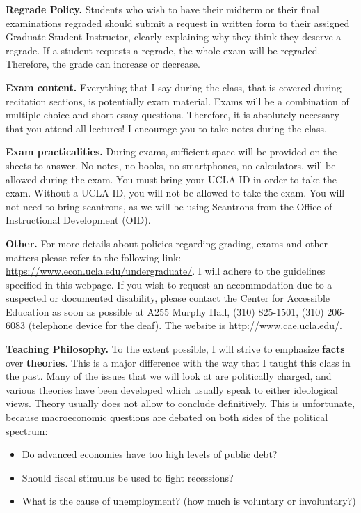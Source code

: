 \documentclass[]{book}
\providecommand{\tightlist}{%
  \setlength{\itemsep}{0pt}\setlength{\parskip}{0pt}}
\theoremstyle{definition}
\theoremstyle{definition}
\theoremstyle{definition}
\theoremstyle{remark}
\begin{document}
\textbf{Regrade Policy.} Students who wish to have their midterm or
their final examinations regraded should submit a request in written
form to their assigned Graduate Student Instructor, clearly explaining
why they think they deserve a regrade. If a student requests a regrade,
the whole exam will be regraded. Therefore, the grade can increase or
decrease.

\textbf{Exam content.} Everything that I say during the class, that is
covered during recitation sections, is potentially exam material. Exams
will be a combination of multiple choice and short essay questions.
Therefore, it is absolutely necessary that you attend all lectures! I
encourage you to take notes during the class.

\textbf{Exam practicalities.} During exams, sufficient space will be
provided on the sheets to answer. No notes, no books, no smartphones, no
calculators, will be allowed during the exam. You must bring your UCLA
ID in order to take the exam. Without a UCLA ID, you will not be allowed
to take the exam. You will not need to bring scantrons, as we will be
using Scantrons from the Office of Instructional Development (OID).

\textbf{Other.} For more details about policies regarding grading, exams
and other matters please refer to the following link:
\url{https://www.econ.ucla.edu/undergraduate/}. I will adhere to the
guidelines specified in this webpage. If you wish to request an
accommodation due to a suspected or documented disability, please
contact the Center for Accessible Education as soon as possible at A255
Murphy Hall, (310) 825-1501, (310) 206-6083 (telephone device for the
deaf). The website is \url{http://www.cae.ucla.edu/}.

\textbf{Teaching Philosophy.} To the extent possible, I will strive to
emphasize \textbf{facts} over \textbf{theories}. This is a major
difference with the way that I taught this class in the past. Many of
the issues that we will look at are politically charged, and various
theories have been developed which usually speak to either ideological
views. Theory usually does not allow to conclude definitively. This is
unfortunate, because macroeconomic questions are debated on both sides
of the political spectrum:

\begin{itemize}
\tightlist
\item
  Do advanced economies have too high levels of public debt?
\item
  Should fiscal stimulus be used to fight recessions?
\item
  What is the cause of unemployment? (how much is voluntary or
  involuntary?)
\end{itemize}
\end{document}

